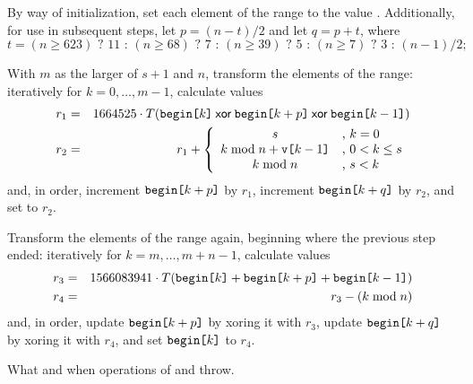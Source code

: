 \begin{itemdescr}
\begin{enumeratea}
 \item
   By way of initialization,
   set each element of the range to the value .
   Additionally,
   for use in subsequent steps,
   let $p = (n - t) / 2$
   and let $q = p + t$,
   where
   \[%
     t = (n \ge 623) \mbox{ ? } 11 \mbox{ : } (n \ge 68) \mbox{ ? } 7 \mbox{ : } (n \ge 39) \mbox{ ? } 5 \mbox{ : } (n \ge 7) \mbox{ ? } 3 \mbox{ : } (n - 1)/2;
   \]%
 \item
   With $m$ as the larger of $s + 1$ and $n$,
   transform the elements of the range:
   iteratively for $ k = 0, \ldots, m-1 $,
   calculate values
   \begin{eqnarray*}
     r_1 & = &
       1664525 \cdot T(    \texttt{\protect begin[}k\texttt{\protect]}
                      \mathbin{\mathsf{xor}} \texttt{\protect begin[}k+p\texttt{\protect]}
                      \mathbin{\mathsf{xor}} \texttt{\protect begin[}k-1 \texttt{\protect]}
                      )
     \\
     r_2 & = & r_1 + \left\{
       \begin{array}{cl}
         s                                  & \mbox{,  } k = 0
         \\
         k \bmod n + \texttt{\protect v[}k-1\texttt{\protect]} & \mbox{,  } 0 < k \le s
         \\
         k \bmod n                          & \mbox{,  } s < k
       \end{array}
     \right.
   \end{eqnarray*}
   and, in order,
   increment $\texttt{\protect begin[}k+p\texttt{\protect]}$ by $r_1$,
   increment $\texttt{\protect begin[}k+q\texttt{\protect]}$ by $r_2$,
   and
   set  to $r_2$.
 \item
   Transform the elements of the range again,
   beginning where the previous step ended:
   iteratively for $ k = m, \ldots, m\!+\!n\!-\!1 $,
   calculate values
   \begin{eqnarray*}
     r_3 & = &
       1566083941 \cdot T( \texttt{\protect begin[}k  \texttt{\protect]}
                         + \texttt{\protect begin[}k+p\texttt{\protect]}
                         + \texttt{\protect begin[}k-1\texttt{\protect]}
                         )
     \\
     r_4 & = & r_3 - (k \bmod n)
   \end{eqnarray*}
   and, in order,
   \noindent
   update $\texttt{\protect begin[}k+p\texttt{\protect]}$ by xoring it with $r_3$,
   update $\texttt{\protect begin[}k+q\texttt{\protect]}$ by xoring it with $r_4$,
   and
   set $\texttt{\protect begin[}k\texttt{\protect]}$ to $r_4$.
\end{enumeratea}

\pnum\throws
What and when  operations of 
and  throw.
\end{itemdescr}

